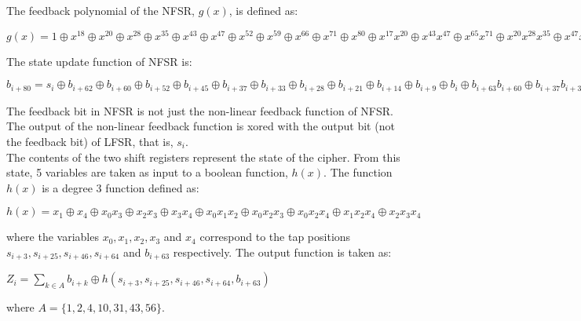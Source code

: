 \documentclass[11pt]{article}
\begin{document}
The feedback polynomial of the NFSR, $g(x)$, is defined as:
\begin{center}
    $g(x) = 1 \oplus x^{18} \oplus x^{20} \oplus x^{28} \oplus x^{35} \oplus x^{43} \oplus x^{47} \oplus x^{52} \oplus x^{59} \oplus x^{66} \oplus x^{71} \oplus x^{80} \oplus x^{17}x^{20} \oplus x^{43}x^{47} \oplus x^{65}x^{71} \oplus x^{20}x^{28}x^{35} \oplus x^{47}x^{52}x^{59} \oplus x^{17}x^{35}x^{52}x^{71} \oplus x^{20}x^{28}x^{43}x^{47} \oplus x^{17}x^{20}x^{59}x^{65} \oplus x^{17}x^{20}x^{28}x^{35}x^{43} \oplus x^{47}x^{52}x^{59}x^{65}x^{71} \oplus x^{28}x^{35}x^{43}x^{47}x^{52}x^{59}$
\end{center}
The state update function of NFSR is:
\begin{center}
   $b_{i+80} = s_i \oplus b_{i+62} \oplus b_{i+60} \oplus b_{i+52} \oplus b_{i+45} \oplus b_{i+37} \oplus b_{i+33} \oplus b_{i+28} \oplus b_{i+21} \oplus b_{i+14} \oplus b_{i+9} \oplus b_i \oplus b_{i+63}b_{i+60} \oplus b_{i+37}b_{i+33} \oplus b_{i+15}b_{i+9} \oplus b_{i+60}b_{i+52}b_{i+45} \oplus b_{i+33}b_{i+28}b_{i+21} \oplus b_{i+63}b_{i+45}b_{i+28}b_{i+9} \oplus b_{i+60}b_{i+52}b_{i+37}b_{i+33} \oplus b_{i+63}b_{i+60}b_{i+21}b_{i+15} \oplus b_{i+63}b_{i+60}b_{i+52}b_{i+45}b_{i+37} \oplus b_{i+33}b_{i+28}b_{i+21}b_{i+15}b_{i+9} \oplus b_{i+52}b_{i+45}b_{i+37}b_{i+33}b_{i+28}b_{i+21}$ 
\end{center}
The feedback bit in NFSR is not just the non-linear feedback function of NFSR. The output of the non-linear feedback function is xored with the output bit (not the feedback bit) of LFSR, that is, $s_i$.\\
\newline
The contents of the two shift registers represent the state of the cipher. From
this state, 5 variables are taken as input to a boolean function, $h(x)$. The function $h(x)$ is a degree 3 function defined as:
\begin{center}
    $h(x) = x_1 \oplus x_4 \oplus x_0x_3 \oplus x_2x_3 \oplus x_3x_4 \oplus x_0x_1x_2 \oplus x_0x_2x_3 \oplus x_0x_2x_4 \oplus x_1x_2x_4 \oplus x_2x_3x_4$
\end{center}
where the variables $x_0, x_1, x_2, x_3$ and $x_4$ correspond to the tap positions $s_{i+3},
s_{i+25}, s_{i+46}, s_{i+64}$ and $b_{i+63}$ respectively. The output function is taken as:
\begin{center}
    $Z_i =  \sum_{k \in A} b_{i+k} \oplus h(s_{i+3},s_{i+25}, s_{i+46}, s_{i+64}, b_{i+63})$
\end{center}
where $A = \{1, 2, 4, 10, 31, 43, 56\}$.\\
\end{document}
